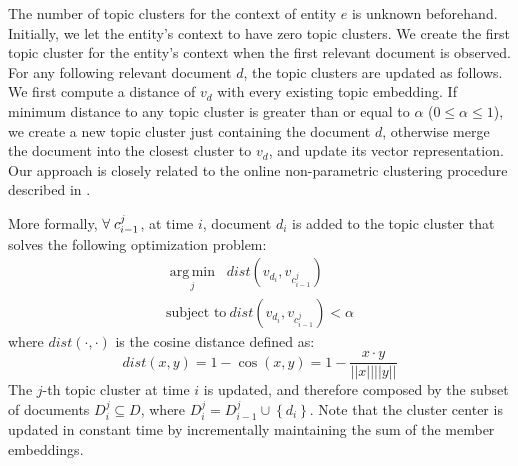 \documentclass{article}
\DeclareMathOperator*{\argmin}{arg\,min}
\begin{document}
The number of topic clusters for the context of entity $e$ is unknown beforehand. Initially, we let the entity's context to have zero topic clusters. 
We create the first topic cluster for the entity's context when the first relevant document is observed. 
For any following relevant document $d$, the topic clusters are updated as follows.
We first compute a distance of $v_d$ with every existing topic embedding.
If minimum distance to any topic cluster is greater than or equal to $\alpha$ ($0 \leq \alpha \leq 1$), we create a new topic cluster just containing the document $d$, otherwise merge the document into the closest cluster to $v_d$, and update its vector representation.
Our approach is closely related to the online non-parametric clustering procedure described in \citet{Arvind14}.


More formally, $\forall\hspace{1mm}c^j_{i-1}$, at time $i$, document $d_i$ is added to the topic cluster that solves the following optimization problem:
\begin{eqnarray}
\underset{j}{\argmin}\;\; dist(v_{d_i}, v_{c^j_{i-1}}) \nonumber\\
\text{subject to}~dist(v_{d_i}, v_{c^j_{i-1}}) < \alpha 
\end{eqnarray}
where $dist(\cdot,\cdot)$ is the cosine distance defined as: %
\begin{equation}
\label{cosine}
dist(x,y) = 1 - \cos(x,y) = 1 - \frac{x \cdot y}{||x||||y||}
\end{equation}
The $j$-th topic cluster at time $i$ is updated, and therefore composed by the subset of documents $D^j_i \subseteq D$, where $D^j_i = D^j_{i-1} \cup \left\{ {d_i}\right\}$.
Note that the cluster center is updated in constant time by incrementally maintaining the sum of the member embeddings.

\end{document}
